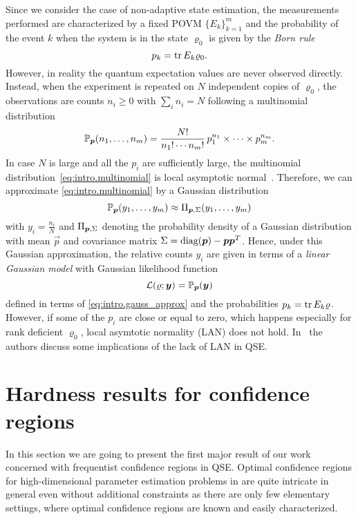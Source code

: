 Since we consider the case of non-adaptive state estimation, the measurements performed are characterized by a fixed POVM $\{E_k\}_{k=1}^m$ and the probability of the event $k$ when the system is in the state $\varrho_0$ is given by the \emph{Born rule}
\[
  p_k = \operatorname{tr} E_k \varrho_0.
\]
However, in reality the quantum expectation values are never observed directly.
Instead, when the experiment is repeated on $N$ independent copies of $\varrho_0$, the observations are counts $n_i \ge 0$ with $\sum_i n_i = N$
following a multinomial distribution
\[
  \label{eq:intro.multinomial}
  \mathbb{P}_{{\boldsymbol{p}}}(n_1, \ldots, n_m) = \frac{N!}{n_1! \cdots n_m!} \, p_1^{n_1} \times \cdots \times p_m^{n_m}.
\]
In case $N$ is large and all the $p_i$ are sufficiently large, the multinomial distribution~\eqref{eq:intro.multinomial} is local asymptotic normal~\cite{Severini_2005_Elements}.
Therefore, we can approximate \cref{eq:intro.multinomial} by a Gaussian distribution
\[
  \label{eq:intro.gauss_approx}
  \mathbb{P}_{{\boldsymbol{p}}}(y_1, \ldots, y_m) \approx \Pi_{{\boldsymbol{p}}, \Sigma}(y_1, \ldots, y_m)
\]
with $y_i = \frac{n_i}{N}$ and $\Pi_{{\boldsymbol{p}}, \Sigma}$ denoting the probability density of a Gaussian distribution with mean $\vec p$ and covariance matrix $\Sigma = \mathrm{diag}({\boldsymbol{p}}) - {\boldsymbol{p}} {\boldsymbol{p}}^T$.
Hence, under this Gaussian approximation, the relative counts $y_i$ are given in terms of a \emph{linear Gaussian model} with Gaussian likelihood function
\[
  \label{eq:intro.gauss_likelihood}
  \mathcal{L}(\varrho; {\boldsymbol{y}}) = \mathbb{P}_{{\boldsymbol{p}}}({\boldsymbol{y}})
\]
defined in terms of \cref{eq:intro.gauss_approx} and the probabilities $p_k = \operatorname{tr} E_k \varrho$.
However, if some of the $p_{i}$ are close or equal to zero, which happens especially for rank deficient $\varrho_{0}$, local asymtotic normality (LAN) does not hold.
In~\cite{Scholten_2016_Behavior} the authors discuss some implications of the lack of LAN in QSE.


\section{Hardness results for confidence regions}
\label{sec:error.ortho}

In this section we are going to present the first major result of our work~\cite{Suess_2016_Error} concerned with frequentist confidence regions in QSE.
Optimal confidence regions for high-dimensional parameter estimation problems in are quite intricate in general even without additional constraints as there are only few elementary settings, where optimal confidence regions are known and easily characterized.

